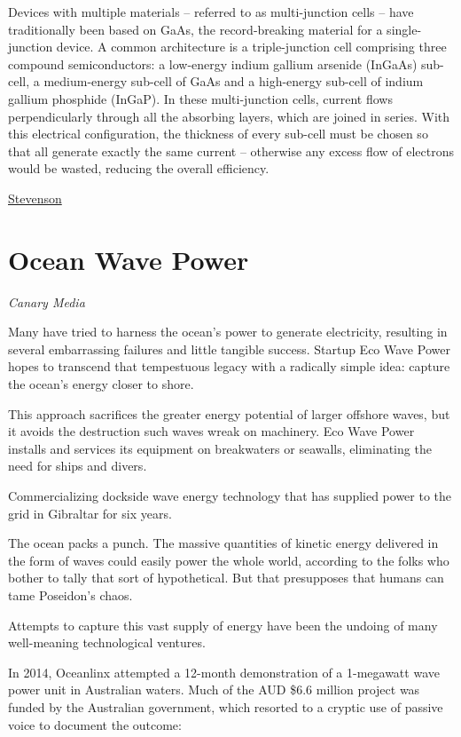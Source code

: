 \documentclass[
]{book}
\begin{document}
Devices with multiple materials -- referred to as multi-junction cells -- have traditionally been based on GaAs, the record-breaking material for a single-junction device. A common architecture is a triple-junction cell comprising three compound semiconductors: a low-energy indium gallium arsen­ide (InGaAs) sub-cell, a medium-energy sub-cell of GaAs and a high-energy sub-cell of indium gallium phosphide (InGaP). In these multi-junction cells, current flows perpendicularly through all the absorbing layers, which are joined in series. With this electrical configuration, the thickness of every sub-cell must be chosen so that all generate exactly the same current -- otherwise any excess flow of electrons would be wasted, reducing the overall efficiency.

\href{https://physicsworld.com/a/sunny-superpower-solar-cells-close-in-on-50-efficiency/}{Stevenson}

\hypertarget{ocean-wave-power}{%
\chapter{Ocean Wave Power}\label{ocean-wave-power}}

\emph{Canary Media}

Many have tried to harness the ocean's power to generate electricity, resulting in several embarrassing failures and little tangible success. Startup Eco Wave Power hopes to transcend that tempestuous legacy with a radically simple idea: capture the ocean's energy closer to shore.

This approach sacrifices the greater energy potential of larger offshore waves, but it avoids the destruction such waves wreak on machinery. Eco Wave Power installs and services its equipment on breakwaters or seawalls, eliminating the need for ships and divers.

Commercializing dockside wave energy technology that has supplied power to the grid in Gibraltar for six years.

The ocean packs a punch. The massive quantities of kinetic energy delivered in the form of waves could easily power the whole world, according to the folks who bother to tally that sort of hypothetical. But that presupposes that humans can tame Poseidon's chaos.

Attempts to capture this vast supply of energy have been the undoing of many well-meaning technological ventures.

In 2014, Oceanlinx attempted a 12-month demonstration of a 1-megawatt wave power unit in Australian waters. Much of the AUD \$6.6 million project was funded by the Australian government, which resorted to a cryptic use of passive voice to document the outcome:
\end{document}
